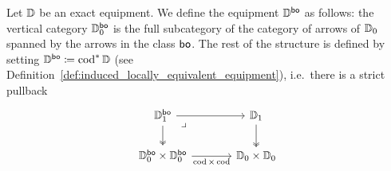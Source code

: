 \documentclass[12pt,oneside,article,draft]{memoir}
\begin{document}
\begin{definition}
   Let $\mathbb{D}$ be an exact equipment. We define the equipment $\mathbb{D}^{\mathsf{bo}}$ as follows: the
   vertical category $\mathbb{D}_0^{\mathsf{bo}}$ is the full subcategory of the category of arrows of
   $\mathbb{D}_0$ spanned by the arrows in the class $\mathsf{bo}$. The rest of the structure is defined by
   setting $\mathbb{D}^{\mathsf{bo}}\coloneqq\operatorname{cod}^*\mathbb{D}$ (see
   Definition~\ref{def:induced_locally_equivalent_equipment}), i.e.\ there is a strict pullback
   \begin{equation*}
      \begin{tikzcd}[column sep=large]
         \dcat{D}_1^{\bo} \ar[r] \ar[d, two heads] \ar[dr,phantom,"\lrcorner" very near start]
            & \dcat{D}_1 \ar[d, two heads] \\
         \dcat{D}_0^{\bo}\times\dcat{D}_0^{\bo} \ar[r,"\cod\times\cod"']
            & \dcat{D}_0\times\dcat{D}_0
      \end{tikzcd}
   \end{equation*}
\end{definition}
\end{document}
